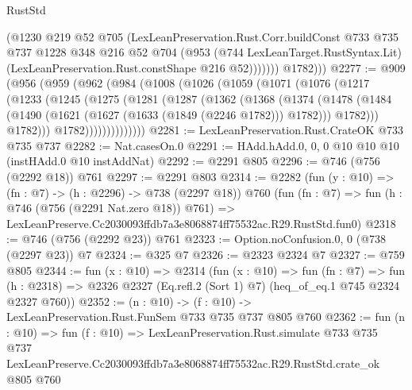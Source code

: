 \begin{lexlean}{RustStd}
\begin{coremodule}
                (@1230
                  @219
                  @52
                  @705
                  (LexLeanPreservation.Rust.Corr.buildConst
                    @733
                    @735
                    @737
                    @1228
                    @348
                    @216
                    @52
                    @704
                    (@953
                      (@744 LexLeanTarget.RustSyntax.Lit)
                      (LexLeanPreservation.Rust.constShape @216 @52)))))))
          @1782)))
@2277 := @909
    (@956
      (@959
        (@962
          (@984
            (@1008
              (@1026
                (@1059
                  (@1071
                    (@1076
                      (@1217
                        (@1233
                          (@1245
                            (@1275
                              (@1281
                                (@1287
                                  (@1362
                                    (@1368
                                      (@1374
                                        (@1478
                                          (@1484
                                            (@1490
                                              (@1621 (@1627 (@1633 (@1849 (@2246 @1782))) @1782)))
                                            @1782)))
                                      @1782)))
                                @1782))))))))))))))
@2281 := LexLeanPreservation.Rust.CrateOK @733 @735 @737
@2282 := Nat.casesOn.{0}
@2291 := HAdd.hAdd.{0, 0, 0} @10 @10 @10 (instHAdd.{0} @10 instAddNat)
@2292 := @2291 @805
@2296 := @746 (@756 (@2292 @18)) @761
@2297 := @2291 @803
@2314 := @2282
    (fun (y : @10) => (fn : @7) -> (h : @2296) -> @738 (@2297 @18))
    @760
    (fun (fn : @7) =>
    fun (h : @746 (@756 (@2291 Nat.zero @18)) @761) =>
    LexLeanPreserve.Cc2030093ffdb7a3e8068874ff75532ac.R29.RustStd.fun0)
@2318 := @746 (@756 (@2292 @23)) @761
@2323 := Option.noConfusion.{0, 0} (@738 (@2297 @23)) @7
@2324 := @325 @7
@2326 := @2323 @2324 @7
@2327 := @759 @805
@2344 := fun (x : @10) =>
  @2314
    (fun (x : @10) =>
    fun (fn : @7) =>
    fun (h : @2318) => @2326 @2327 (Eq.refl.{2} (Sort 1) @7) (heq_of_eq.{1} @745 @2324 @2327 @760))
@2352 := (n : @10) -> (f : @10) -> LexLeanPreservation.Rust.FunSem @733 @735 @737 @805 @760
@2362 := fun (n : @10) =>
  fun (f : @10) =>
  LexLeanPreservation.Rust.simulate
    @733
    @735
    @737
    LexLeanPreserve.Cc2030093ffdb7a3e8068874ff75532ac.R29.RustStd.crate_ok
    @805
    @760
\end{coremodule}
\end{lexlean}
